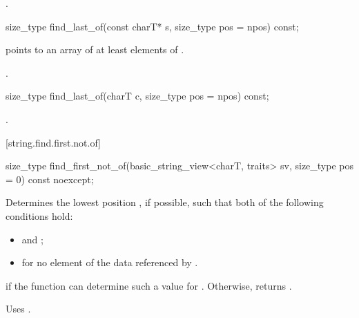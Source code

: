 \begin{itemdescr}
\pnum
\returns
{}.
\end{itemdescr}

%
\begin{itemdecl}
size_type find_last_of(const charT* s, size_type pos = npos) const;
\end{itemdecl}

\begin{itemdescr}
\pnum
\requires {} points to an array of at least 
elements of .

\pnum
\returns
{}.
\end{itemdescr}

%
\begin{itemdecl}
size_type find_last_of(charT c, size_type pos = npos) const;
\end{itemdecl}

\begin{itemdescr}
\pnum
\returns
{}.
\end{itemdescr}

[string.find.first.not.of]{}

%
\begin{itemdecl}
size_type find_first_not_of(basic_string_view<charT, traits> sv,
                            size_type pos = 0) const noexcept;
\end{itemdecl}

\begin{itemdescr}
\pnum
\effects
Determines the lowest position , if possible, such that both of
the following conditions hold:
\begin{itemize}
\item
{}
and
;
\item
{}%
for no element  of the data referenced by .
\end{itemize}

\pnum
\returns
{} if the function can determine such a value for .
Otherwise, returns
.

\pnum
\remarks
Uses
.
\end{itemdescr}

